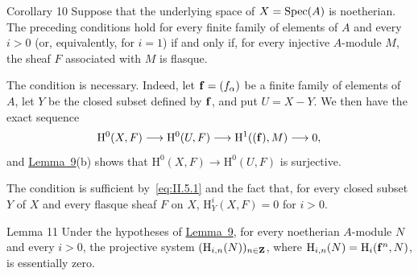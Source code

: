 \begin{sgastatement}{Corollary 10}
Suppose that the underlying space of $X=\operatorname{Spec}(A)$ is noetherian. The
preceding conditions hold for every finite family of elements of $A$ and
every $i>0$ (or, equivalently, for $i=1$) if and only if, for every injective
$A$-module $M$, the sheaf $F$ associated with $M$ is flasque.
\end{sgastatement}

The condition is necessary. Indeed, let $\mathbf f=(f_\alpha)$ be a finite family
of elements of $A$, let $Y$ be the closed subset defined by $\mathbf f$, and put
$U=X-Y$. We then have the exact sequence
\[
  \mathrm H^0(X,F)\longrightarrow \mathrm H^0(U,F)
  \longrightarrow \mathrm H^1((\mathbf f),M)\longrightarrow0,
\]
and \hyperref[II.9]{Lemma~9}(b) shows that
$\mathrm H^0(X,F)\to\mathrm H^0(U,F)$ is surjective.

The condition is sufficient by~\eqref{eq:II.5.1} and the fact
that, for every closed subset $Y$ of $X$ and every flasque sheaf $F$ on $X$,
$\mathrm H_Y^i(X,F)=0$ for $i>0$.

\begin{sgastatement}{Lemma 11}
Under the hypotheses of \hyperref[II.9]{Lemma~9}, for every noetherian $A$-module $N$ and
every $i>0$, the projective system
$(\mathrm H_{i,n}(N))_{n\in\mathbf Z}$, where
$\mathrm H_{i,n}(N)=\mathrm H_i(\mathbf f^n,N)$, is essentially zero.
\end{sgastatement}

